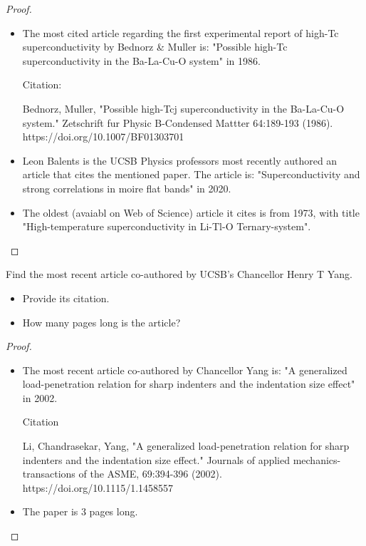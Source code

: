 \documentclass{article}
\begin{document}
\begin{proof}
    \begin{itemize}
        \item[a.] The most cited article regarding the first experimental report of high-Tc superconductivity by Bednorz \& Muller is: "Possible high-Tc superconductivity in the Ba-La-Cu-O system" in 1986.
        
        Citation:

        \hfil

        Bednorz, Muller, "Possible high-Tcj superconductivity in the Ba-La-Cu-O system." Zetschrift fur Physic B-Condensed Mattter 64:189-193 (1986). https://doi.org/10.1007/BF01303701 

        \hfil

        \item[b.] Leon Balents is the UCSB Physics professors most recently authored an article that cites the mentioned paper. The article is: "Superconductivity and strong correlations in moire flat bands" in 2020.
        \item[c.] The oldest (avaiabl on Web of Science) article it cites is from 1973, with title "High-temperature superconductivity in Li-Tl-O Ternary-system".
    \end{itemize}
\end{proof}

\hfil

\begin{ques}
    Find the most recent article co-authored by UCSB’s Chancellor Henry T Yang.
    \begin{itemize}
        \item[a.] Provide its citation.
        \item[b.] How many pages long is the article? 
    \end{itemize}
\end{ques}

\begin{proof}
    \begin{itemize}
        \item[a.] The most recent article co-authored by Chancellor Yang is: "A generalized load-penetration relation for sharp indenters and the indentation size effect" in 2002.
        
        Citation
        
        \hfil

        Li, Chandrasekar, Yang, "A generalized load-penetration relation for sharp indenters and the indentation size effect." Journals of applied mechanics-transactions of the ASME, 69:394-396 (2002). https://doi.org/10.1115/1.1458557 

        \hfil

        \item[b.] The paper is 3 pages long.
    \end{itemize}
\end{proof}
\end{document}
